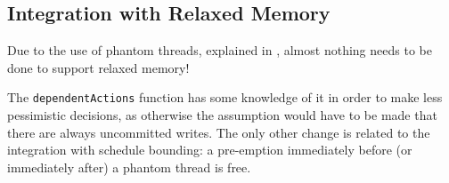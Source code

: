 \subsection{Integration with Relaxed Memory}
\label{sec:sct-por-relaxed}

Due to the use of phantom threads, explained in
, almost nothing needs to be done to
support relaxed memory!

The \verb|dependentActions| function has some knowledge of it in order
to make less pessimistic decisions, as otherwise the assumption would
have to be made that there are always uncommitted writes. The only
other change is related to the integration with schedule bounding: a
pre-emption immediately before (or immediately after) a phantom thread
is free.
